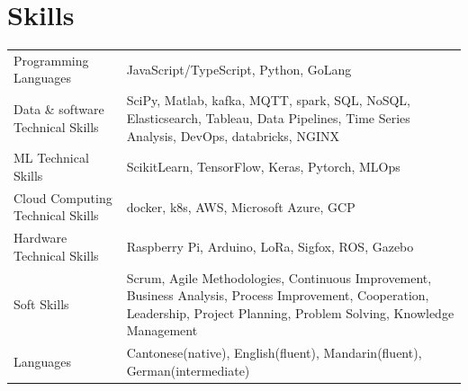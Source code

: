 \documentclass[a4paper,12pt]{article}
\begin{document}
\section{Skills}
\begin{tabularx}{\linewidth}{@{}l X@{}}
Programming Languages & \normalsize{JavaScript/TypeScript, Python, GoLang}\\
Data \& software Technical Skills & \normalsize{SciPy, Matlab, kafka, MQTT, spark, SQL, NoSQL, Elasticsearch, Tableau, Data Pipelines, Time Series Analysis, DevOps, databricks, NGINX}\\
ML Technical Skills & \normalsize{ScikitLearn, TensorFlow, Keras, Pytorch, MLOps}\\
Cloud Computing Technical Skills & \normalsize{docker, k8s, AWS, Microsoft Azure, GCP}\\
Hardware Technical Skills & \normalsize{Raspberry Pi, Arduino, LoRa, Sigfox, ROS, Gazebo}\\
Soft Skills & \normalsize{Scrum, Agile Methodologies, Continuous Improvement, Business Analysis, Process Improvement, Cooperation, Leadership, Project Planning, Problem Solving, Knowledge Management}\\
Languages & \normalsize{Cantonese(native), English(fluent), Mandarin(fluent), German(intermediate)}\\
\end{tabularx}

\vfill
{}
\end{document}
